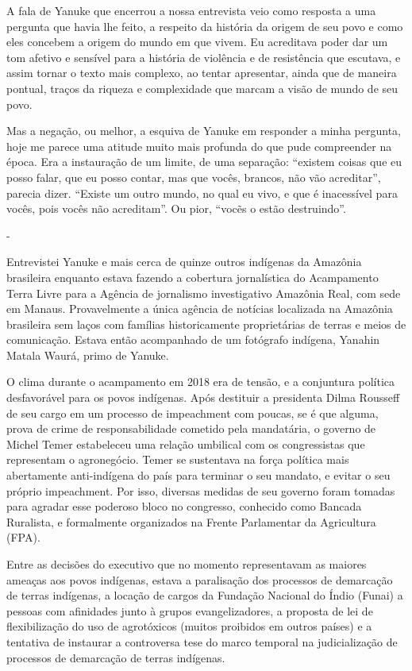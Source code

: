 A fala de Yanuke que encerrou a nossa entrevista veio como resposta a
uma pergunta que havia lhe feito, a respeito da história da origem de
seu povo e como eles concebem a origem do mundo em que vivem. Eu
acreditava poder dar um tom afetivo e sensível para a história de
violência e de resistência que escutava, e assim tornar o texto mais
complexo, ao tentar apresentar, ainda que de maneira pontual, traços da
riqueza e complexidade que marcam a visão de mundo de seu povo.

Mas a negação, ou melhor, a esquiva de Yanuke em responder a minha
pergunta, hoje me parece uma atitude muito mais profunda do que pude
compreender na época. Era a instauração de um limite, de uma separação:
``existem coisas que eu posso falar, que eu posso contar, mas que vocês,
brancos, não vão acreditar'', parecia dizer. ``Existe um outro mundo, no
qual eu vivo, e que é inacessível para vocês, pois vocês não
acreditam''. Ou pior, ``vocẽs o estão destruindo''.

-

Entrevistei Yanuke e mais cerca de quinze outros indígenas da Amazônia
brasileira enquanto estava fazendo a cobertura jornalística do
Acampamento Terra Livre para a Agência de jornalismo investigativo
Amazônia Real, com sede em Manaus. Provavelmente a única agência de
notícias localizada na Amazônia brasileira sem laços com famílias
historicamente proprietárias de terras e meios de comunicação. Estava
então acompanhado de um fotógrafo indígena, Yanahin Matala Waurá, primo
de Yanuke.

O clima durante o acampamento em 2018 era de tensão, e a conjuntura
política desfavorável para os povos indígenas. Após destituir a
presidenta Dilma Rousseff de seu cargo em um processo de impeachment com
poucas, se é que alguma, prova de crime de responsabilidade cometido
pela mandatária, o governo de Michel Temer estabeleceu uma relação
umbilical com os congressistas que representam o agronegócio. Temer se
sustentava na força política mais abertamente anti-indígena do país para
terminar o seu mandato, e evitar o seu próprio impeachment. Por isso,
diversas medidas de seu governo foram tomadas para agradar esse poderoso
bloco no congresso, conhecido como Bancada Ruralista, e formalmente
organizados na Frente Parlamentar da Agricultura (FPA).

Entre as decisões do executivo que no momento representavam as maiores
ameaças aos povos indígenas, estava a paralisação dos processos de
demarcação de terras indígenas, a locação de cargos da Fundação Nacional
do Índio (Funai) a pessoas com afinidades junto à grupos
evangelizadores, a proposta de lei de flexibilização do uso de
agrotóxicos (muitos proibidos em outros países) e a tentativa de
instaurar a controversa tese do marco temporal na judicialização de
processos de demarcação de terras indígenas.

